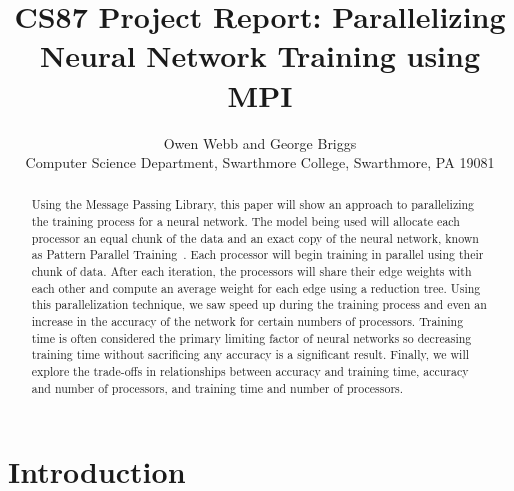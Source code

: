 \documentclass[11pt,twocolumn]{article}
\begin{document}
\title{CS87 Project Report: 
Parallelizing Neural Network Training using MPI}

\author{Owen Webb and George Briggs \\
Computer Science Department, Swarthmore College, Swarthmore, PA  19081}

\maketitle

\begin{abstract}

Using the Message Passing Library, this paper will show an approach to parallelizing the training process for a neural network. The model being used will allocate each processor an equal chunk of the data and an exact copy of the neural network, known as Pattern Parallel Training~\cite{dahl:NNCluster}. Each processor will begin training in parallel using their chunk of data. After each iteration, the processors will share their edge weights with each other and compute an average weight for each edge using a reduction tree. Using this parallelization technique, we saw speed up during the training process and even an increase in the accuracy of the network for certain numbers of processors. Training time is often considered the primary limiting factor of neural networks so decreasing training time without sacrificing any accuracy is a significant result. Finally, we will explore the trade-offs in relationships between accuracy and training time, accuracy and number of processors, and training time and number of processors.

\end{abstract}


\section {Introduction} 


\end{document}

